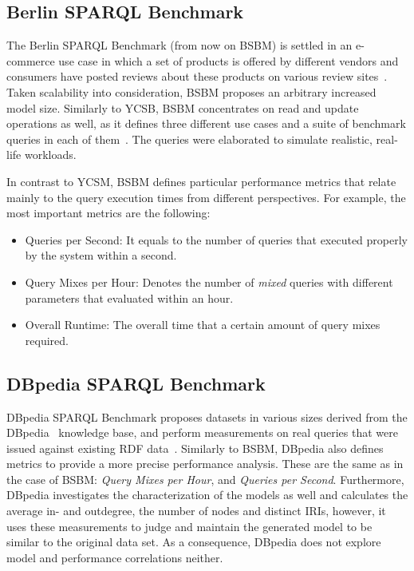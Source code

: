 \subsection{Berlin SPARQL Benchmark}

The Berlin SPARQL Benchmark (from now on BSBM) is settled in an e-commerce use case in which a set of products
is offered by different vendors and consumers have posted reviews about these products on various review sites~\cite{berlin}. Taken scalability into consideration, BSBM proposes an arbitrary increased model size. Similarly to YCSB, BSBM concentrates on read and update operations as well, as it defines three different use cases and a suite of benchmark queries in each of them~\cite{berlin_specification}. The queries were elaborated to simulate realistic, real-life workloads.

In contrast to YCSM, BSBM defines particular performance metrics that relate mainly to the query execution times from different perspectives. For example, the most important metrics are the following:
\begin{itemize}
	\item{Queries per Second}: It equals to the number of queries that executed properly by the system within a second.
	\item{Query Mixes per Hour}: Denotes the number of \textit{mixed} queries with different parameters that evaluated within an hour.
	\item{Overall Runtime}: The overall time that a certain amount of query mixes required.
\end{itemize}


\subsection{DBpedia SPARQL Benchmark}
DBpedia SPARQL Benchmark proposes datasets in various sizes derived from the DBpedia~\cite{dbpedia_data} knowledge base, and perform measurements on real queries that were issued against existing RDF data~\cite{dbpedia}. Similarly to BSBM, DBpedia also defines metrics to provide a more precise performance analysis. These are the same as in the case of BSBM: \textit{Query Mixes per Hour}, and \textit{Queries per Second}. Furthermore, DBpedia investigates the characterization of the models as well and calculates the average in- and outdegree, the number of nodes and distinct IRIs, however, it uses these measurements to judge and maintain the generated model to be similar to the original data set. As a consequence, DBpedia does not explore model and performance correlations neither.

